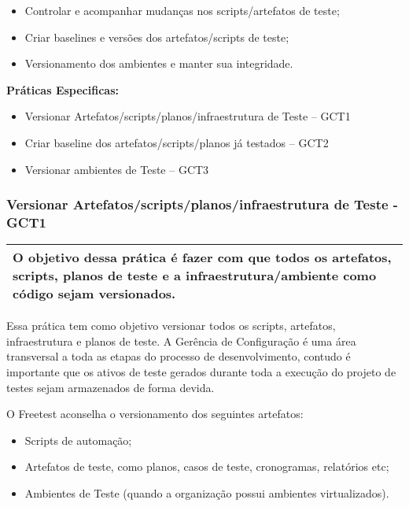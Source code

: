 \begin{itemize}
    \item Controlar e acompanhar mudanças nos scripts/artefatos de teste;
    \item Criar baselines e versões dos artefatos/scripts de teste;
    \item Versionamento dos ambientes e manter sua integridade.
\end{itemize}

\textbf{Práticas Especificas: }
\begin{itemize}
    \item Versionar Artefatos/scripts/planos/infraestrutura de Teste – GCT1
    \item Criar baseline dos artefatos/scripts/planos já testados – GCT2
    \item Versionar ambientes de Teste – GCT3
\end{itemize}

\subsubsection{ Versionar Artefatos/scripts/planos/infraestrutura de Teste - GCT1 }
\label{sec:gct1}

\begin{table}[!ht]
\centering
\begin{tabular}{|p{130mm}|}
\hline
O objetivo dessa prática é fazer com que todos os artefatos, scripts, planos de teste e a infraestrutura/ambiente como código sejam versionados. \\ 
\hline
\end{tabular}
\end{table}

Essa prática tem como objetivo versionar todos os scripts, artefatos, infraestrutura e planos de teste. A Gerência de Configuração é uma área transversal a toda as etapas do processo de desenvolvimento, contudo é importante que os ativos de teste gerados durante toda a execução do projeto de testes sejam armazenados de forma devida.

O Freetest aconselha o versionamento dos seguintes artefatos:

\begin{itemize}
    \item Scripts de automação;
    \item Artefatos de teste, como planos, casos de teste, cronogramas, relatórios etc;
    \item Ambientes de Teste (quando a organização possui ambientes virtualizados).
\end{itemize}

